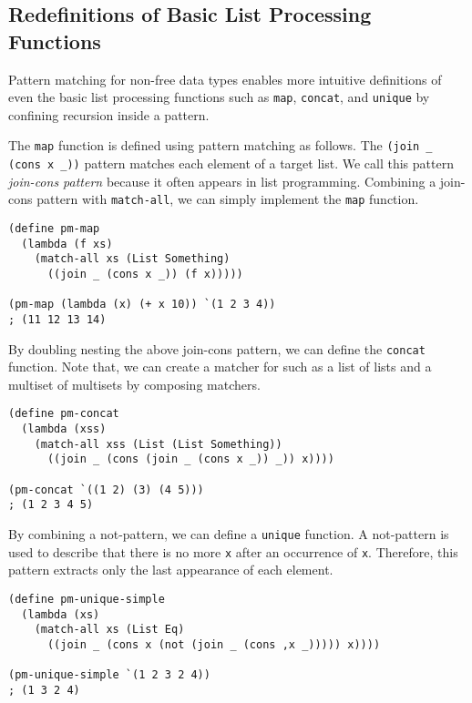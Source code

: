 \documentclass[acmlarge]{acmart}
\begin{document}
\subsection{Redefinitions of Basic List Processing Functions}

Pattern matching for non-free data types enables more intuitive definitions of even the basic list processing functions such as \texttt{map}, \texttt{concat}, and \texttt{unique} by confining recursion inside a pattern.

The \texttt{map} function is defined using pattern matching as follows.
The \texttt{(join _ (cons x _))} pattern matches each element of a target list.
We call this pattern \emph{join-cons pattern} because it often appears in list programming.
Combining a join-cons pattern with \texttt{match-all}, we can simply implement the \texttt{map} function.

\begin{lstlisting}[language=egison]
(define pm-map
  (lambda (f xs)
    (match-all xs (List Something)
      ((join _ (cons x _)) (f x)))))

(pm-map (lambda (x) (+ x 10)) `(1 2 3 4))
; (11 12 13 14)
\end{lstlisting}

\noindent By doubling nesting the above join-cons pattern, we can define the \texttt{concat} function.
Note that, we can create a matcher for such as a list of lists and a multiset of multisets by composing matchers.

\begin{lstlisting}[language=egison]
(define pm-concat
  (lambda (xss)
    (match-all xss (List (List Something))
      ((join _ (cons (join _ (cons x _)) _)) x))))

(pm-concat `((1 2) (3) (4 5)))
; (1 2 3 4 5)
\end{lstlisting}

\noindent By combining a not-pattern, we can define a \texttt{unique} function.
A not-pattern is used to describe that there is no more \texttt{x} after an occurrence of \texttt{x}.
Therefore, this pattern extracts only the last appearance of each element.

\begin{lstlisting}[language=egison]
(define pm-unique-simple
  (lambda (xs)
    (match-all xs (List Eq)
      ((join _ (cons x (not (join _ (cons ,x _))))) x))))

(pm-unique-simple `(1 2 3 2 4))
; (1 3 2 4)
\end{lstlisting}
\end{document}
